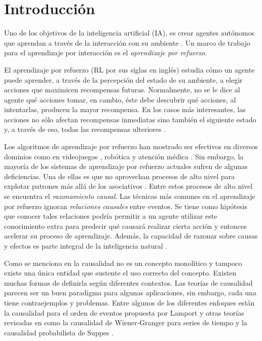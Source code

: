 \chapter{Introducción}



\graphicspath{{Chapter1/Figs/}}

Uno de los objetivos de la inteligencia artificial (IA), es crear agentes autónomos que aprendan
a través de la interacción con su ambiente \cite{surveyDRL2017}.
Un marco de trabajo para el aprendizaje por interacción es el \textit{aprendizaje por
refuerzo}.


El aprendizaje por refuerzo (RL por sus siglas en inglés) estudia cómo un agente puede aprender, a través de la percepción del estado de su ambiente,
a elegir acciones que maximicen recompensas futuras. 
Normalmente, no se le dice al agente qué acciones
tomar, en cambio, éste debe descubrir qué acciones, al intentarlas, producen la mayor recompensa.
En los casos más interesantes, las acciones no sólo afectan recompensas inmediatas
sino también el siguiente estado y, a través de eso, todas las recompensas ulteriores \cite{sutton_barto_2018}.

Los algoritmos de aprendizaje por refuerzo 
han mostrado ser efectivos en diversos dominios como en videojuegos \cite{mnih2013playing} \cite{vinyals2019grandmaster}, 
robótica \cite{openai2019solving}
y atención médica \cite{gottesman2018evaluating}.
Sin embargo, la mayoría de los  sistemas de aprendizaje por refuerzo actuales sufren de algunas deficiencias. Una de ellas es que no aprovechan procesos de
alto nivel para 
explotar patrones más allá de los asociativos \cite{garnelo2016deep}\cite{playingagainstnature2018}. Entre estos procesos de alto nivel se encuentra el \textit{razonamiento causal}. Las técnicas más comunes
en el aprendizaje por refuerzo ignoran \textit{relaciones causales} entre eventos.
Se tiene como hipótesis que conocer tales relaciones podría permitir a un agente 
utilizar este conocimiento extra
para predecir qué causará realizar cierta acción
y entonces acelerar su proceso de aprendizaje.
Además, la capacidad de razonar sobre causas y efectos es parte integral de
la inteligencia natural \cite{nair2019causal}.


Como se menciona en \cite{theoryofcausalities2006} 
la causalidad no es un concepto monolítico y tampoco
existe una única entidad que sustente el uso correcto
del concepto. Existen muchas formas de definirla según diferentes contextos. Las teorías de causalidad
parecen ser un buen paradigma para algunas aplicaciones,
sin embargo, cada una tiene contraejemplos y problemas.
Entre algunos de los diferentes enfoques 
están la causalidad para
el orden de eventos propuesta por Lamport \cite{lamport2019time} y otras teorías revisadas en
\cite{holland1986statistics} como la causalidad de Wiener-Granger para
series de tiempo \cite{granger1969investigating} y la 
causalidad probabilista de Suppes \cite{suppes1973probabilistic}. 

